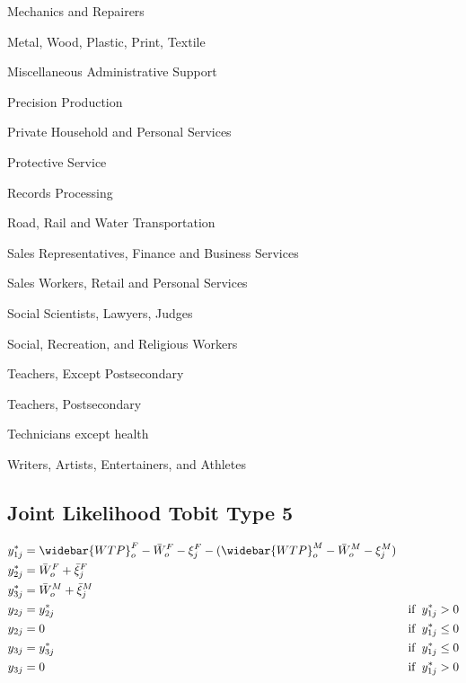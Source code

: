 \documentclass[11pt]{article}
\begin{document}
   Mechanics and Repairers
   
   Metal, Wood, Plastic, Print, Textile
   
   Miscellaneous Administrative Support
   
   Precision Production
   
   Private Household and Personal Services
   
   Protective Service
   
   Records Processing
   
   Road, Rail and Water Transportation
   
   Sales Representatives, Finance and Business Services
   
   Sales Workers, Retail and Personal Services
   
   Social Scientists, Lawyers, Judges
   
   Social, Recreation, and Religious Workers
   
   Teachers, Except Postsecondary
   
   Teachers, Postsecondary
   
   Technicians except health
   
   Writers, Artists, Entertainers, and Athletes
   
   
 \subsection{Joint Likelihood Tobit Type 5}


\begin{align*}
y_{1j}^* &= \widebar{WTP}^F_o - \bar{W}^F_o  - \xi^F_j - (\widebar{WTP}^M_o - \bar{W}^M_o  - \xi^M_j) \\
y_{2j}^* &= \bar{W}^F_o + \bar{\xi}^F_j \\
y_{3j}^* &= \bar{W}^M_o + \bar{\xi}^M_j \\
y_{2j} &= y_{2j}^* \hspace{10mm} &\text{if} \hspace{2mm} y_{1j}^* >0 \\
y_{2j} &= 0 \hspace{10mm} &\text{if} \hspace{2mm} y_{1j}^* \leq 0 \\
y_{3j} &= y_{3j}^* \hspace{10mm} &\text{if} \hspace{2mm} y_{1j}^* \leq 0 \\
y_{3j} &= 0 \hspace{10mm} &\text{if} \hspace{2mm} y_{1j}^* > 0 \\
\end{align*}
\end{document}
